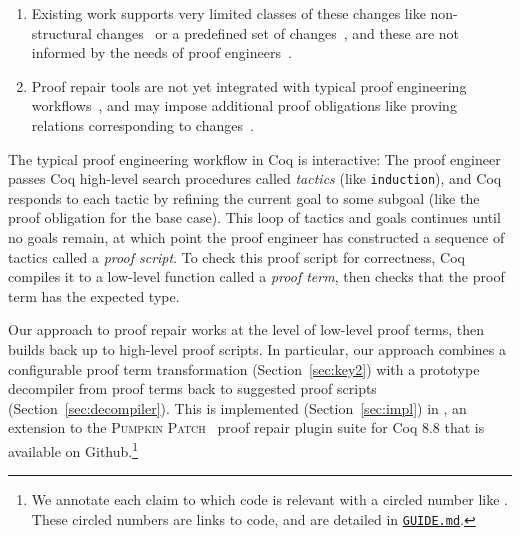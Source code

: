 \begin{enumerate}
\item Existing work supports very limited classes of these changes like non-structural changes~\cite{pumpkinpatch} or a predefined set
of changes~\cite{robert2018, wibergh2019}, and these are not informed by the needs of proof engineers~\cite{replica}.
\item Proof repair tools are not yet integrated with typical proof engineering workflows~\cite{PGL-045, pumpkinpatch, robert2018},
and may impose additional proof obligations like proving relations corresponding to changes~\cite{Ringer2019}.
\end{enumerate}

The typical proof engineering workflow in Coq is interactive:
The proof engineer passes Coq high-level search procedures called \textit{tactics} (like \lstinline{induction}),
and Coq responds to each tactic by refining the current goal to some subgoal (like the proof obligation for the base case).
This loop of tactics and goals continues until no goals remain, at which point the proof engineer 
has constructed a sequence of tactics called a \textit{proof script}.
To check this proof script for correctness, Coq compiles it to a low-level function called a \textit{proof term},
then checks that the proof term has the expected type.

Our approach to proof repair works at the level of low-level proof terms, then builds back up to high-level proof scripts.
In particular, our approach combines a configurable proof term transformation (Section~\ref{sec:key2}) with a prototype decompiler from proof terms
back to suggested proof scripts (Section~\ref{sec:decompiler}). %
This is implemented (Section~\ref{sec:impl}) in \toolname, an extension to the \textsc{Pumpkin Patch}~\cite{pumpkinpatch} proof repair plugin suite for Coq 8.8 that is available on Github.\footnote{We annotate each claim to which code is relevant with a circled number like . These circled numbers are links to code, and are detailed in \href{https://github.com/uwplse/pumpkin-pi/blob/v2.0.0/GUIDE.md}{\lstinline{GUIDE.md}}.} %


